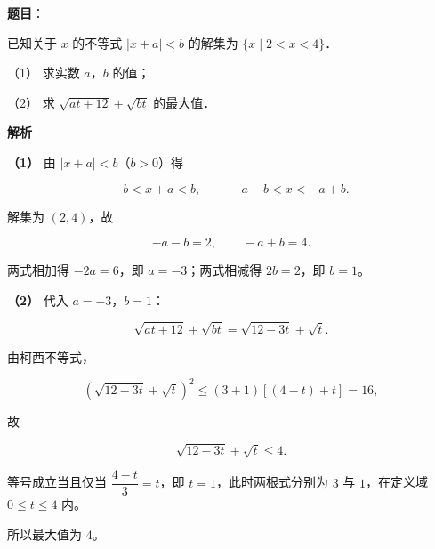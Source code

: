 \begin{answer}

\textbf{题目}：

已知关于 $x$ 的不等式 $|x+a|<b$ 的解集为 $\{x\mid 2<x<4\}$．

（1） 求实数 $a$，$b$ 的值；

（2） 求 $\sqrt{at+12}+\sqrt{bt}$ 的最大值．

\textbf{解析}

\textbf{（1）} 由 $|x+a|<b$（$b>0$）得

\nopagebreak[4]
\[
-b<x+a<b,\qquad -a-b<x<-a+b.
\]

解集为 $(2,4)$，故

\nopagebreak[4]
\[
-a-b=2,\qquad -a+b=4.
\]

两式相加得 $-2a=6$，即 $a=-3$；两式相减得 $2b=2$，即 $b=1$。

\textbf{（2）} 代入 $a=-3$，$b=1$：

\nopagebreak[4]
\[
\sqrt{at+12}+\sqrt{bt}=\sqrt{12-3t}+\sqrt{t}.
\]

由柯西不等式，

\nopagebreak[4]
\[
\left(\sqrt{12-3t}+\sqrt{t}\right)^{2}\le (3+1)\left[(4-t)+t\right]=16,
\]

故

\nopagebreak[4]
\[
\sqrt{12-3t}+\sqrt{t}\le 4.
\]

等号成立当且仅当 $\dfrac{4-t}{3}=t$，即 $t=1$，此时两根式分别为 $3$ 与 $1$，在定义域 $0\le t\le 4$ 内。

所以最大值为 $4$。



\end{answer}